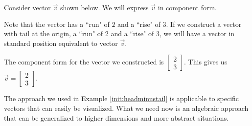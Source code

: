 \documentclass{ximera}
\begin{document}
\begin{example}\label{init:headminustail}
Consider vector $\vec{v}$ shown below.  We will express $\vec{v}$ in component form.

\begin{center}
\end{center}
\begin{explanation}
Note that the vector has a ``run" of $2$ and a ``rise" of $3$.  If we construct a vector with tail at the origin, a ``run" of $2$ and a ``rise" of $3$, we will have a vector in standard position equivalent to vector $\vec{v}$.
\begin{center}
\end{center}
The component form for the vector we constructed is $\begin{bmatrix}2\\3\end{bmatrix}$.  This gives us $\vec{v}=\begin{bmatrix}2\\3\end{bmatrix}$.
\end{explanation}
\end{example}
The approach we used in Example \ref{init:headminustail} is applicable to specific vectors that can easily be visualized.  What we need now is an algebraic approach that can be generalized to higher dimensions and more abstract situations.  
\end{document}
